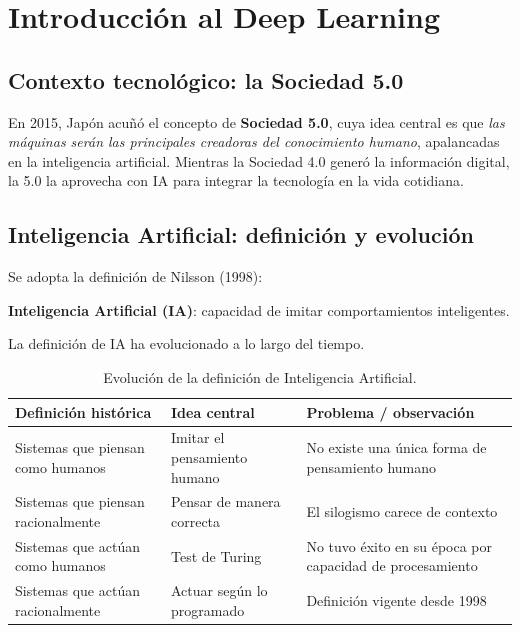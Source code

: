 ﻿%

\chapter{Introducción al Deep Learning}

\section{Contexto tecnológico: la Sociedad 5.0}

En 2015, Japón acuñó el concepto de \textbf{Sociedad 5.0}, cuya idea central es que \emph{las máquinas serán las principales creadoras del conocimiento humano}, apalancadas en la inteligencia artificial. Mientras la Sociedad 4.0 generó la información digital, la 5.0 la aprovecha con IA para integrar la tecnología en la vida cotidiana.

\section{Inteligencia Artificial: definición y evolución}

Se adopta la definición de Nilsson (1998):

\begin{definicion}
\textbf{Inteligencia Artificial (IA)}: capacidad de imitar comportamientos inteligentes.
\end{definicion}

La definición de IA ha evolucionado a lo largo del tiempo.

\begin{table}[H]
\centering
\caption{Evolución de la definición de Inteligencia Artificial.}
\label{tab:evolucion-ia}
\small
\begin{tabularx}{\textwidth}{@{}lXX@{}}
\toprule
\textbf{Definición histórica} & \textbf{Idea central} & \textbf{Problema / observación} \\
\midrule
Sistemas que piensan como humanos & Imitar el pensamiento humano & No existe una única forma de pensamiento humano \\
Sistemas que piensan racionalmente & Pensar de manera correcta & El silogismo carece de contexto \\
Sistemas que actúan como humanos & Test de Turing & No tuvo éxito en su época por capacidad de procesamiento \\
Sistemas que actúan racionalmente & Actuar según lo programado & Definición vigente desde 1998 \\
\bottomrule
\end{tabularx}
\end{table}

